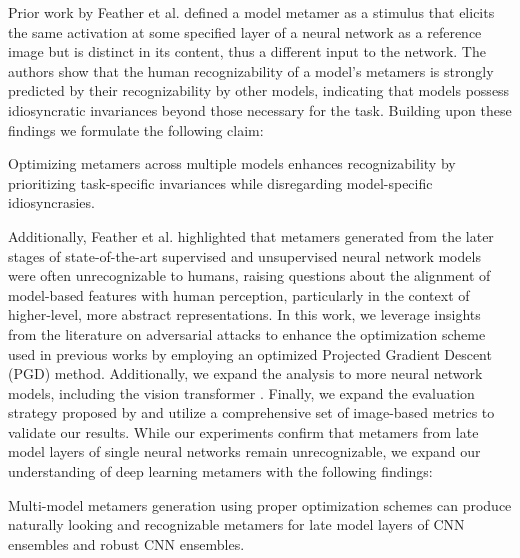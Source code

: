 \documentclass[pdflatex,sn-mathphys-num]{sn-jnl}%
\theoremstyle{thmstyleone}%
\theoremstyle{thmstyletwo}%
\theoremstyle{thmstylethree}%
\begin{document}
Prior work by Feather et al. \cite{feather_model_2023} defined a model metamer as a stimulus that elicits the same activation at some specified layer of a neural network as a reference image but is distinct in its content, thus a different input to the network.
The authors show that the human recognizability of a model’s metamers is strongly predicted by their recognizability by other models, indicating that models possess idiosyncratic invariances beyond those necessary for the task. Building upon these findings we formulate the following claim:


\begin{mdframed}[
  backgroundcolor=gray!10, %
  linecolor=black, %
  roundcorner=5pt, %
  frametitle={}, 
]

Optimizing metamers across multiple models enhances recognizability by prioritizing task-specific invariances while disregarding model-specific idiosyncrasies.

\end{mdframed}


Additionally, Feather et al. \cite{feather_model_2023} highlighted that metamers generated from the later stages of state-of-the-art supervised and unsupervised neural network models were often unrecognizable to humans, raising questions about the alignment of model-based features with human perception, particularly in the context of higher-level, more abstract representations. In this work, we leverage insights from the literature on adversarial attacks \cite{xu2020adversarial} to enhance the optimization scheme used in previous works by employing an optimized Projected Gradient Descent (PGD) method. Additionally,  we expand the analysis to more neural network models, including the vision transformer \cite{khan2022transformers}. Finally, we expand the evaluation strategy proposed by \cite{feather_model_2023} and utilize a comprehensive set of image-based metrics to validate our results. 
While our experiments confirm that metamers from late model layers of single neural networks remain unrecognizable, we expand our understanding of deep learning metamers with the following findings:


\begin{mdframed}[
  backgroundcolor=gray!10, %
  linecolor=black, %
  roundcorner=5pt, %
  frametitle={}, 
]

Multi-model metamers generation using proper optimization schemes can produce naturally looking and recognizable metamers for late model layers of CNN ensembles and robust CNN ensembles.

\end{mdframed}
\end{document}
